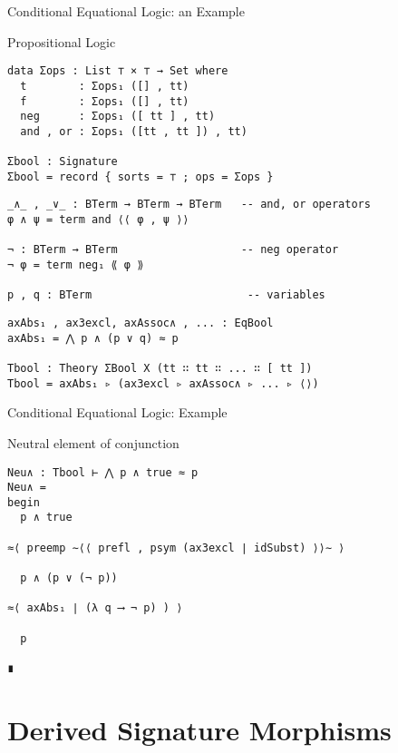 \documentclass[11pt]{beamer}
\begin{document}
\begin{frame}[fragile]{Conditional Equational Logic: an Example}

  \begin{block}{Propositional Logic}
    \begin{verbatim}
data Σops : List ⊤ × ⊤ → Set where
  t        : Σops₁ ([] , tt)
  f        : Σops₁ ([] , tt)
  neg      : Σops₁ ([ tt ] , tt)
  and , or : Σops₁ ([tt , tt ]) , tt)

Σbool : Signature
Σbool = record { sorts = ⊤ ; ops = Σops }
\end{verbatim}
%
\pause
%    
\begin{verbatim}
_∧_ , _∨_ : BTerm → BTerm → BTerm   -- and, or operators
φ ∧ ψ = term and ⟨⟨ φ , ψ ⟩⟩
  
¬ : BTerm → BTerm                   -- neg operator
¬ φ = term neg₁ ⟪ φ ⟫   

p , q : BTerm                        -- variables
\end{verbatim}
\pause
\begin{verbatim}
axAbs₁ , ax3excl, axAssoc∧ , ... : EqBool
axAbs₁ = ⋀ p ∧ (p ∨ q) ≈ p

Tbool : Theory ΣBool X (tt ∷ tt ∷ ... ∷ [ tt ])
Tbool = axAbs₁ ▹ (ax3excl ▹ axAssoc∧ ▹ ... ▹ ⟨⟩)
\end{verbatim}
    
\end{block}
\end{frame}

\begin{frame}[fragile]{Conditional Equational Logic: Example}

\begin{block}{Neutral element of conjunction}
\begin{verbatim}
Neu∧ : Tbool ⊢ ⋀ p ∧ true ≈ p
Neu∧ =
begin
  p ∧ true

≈⟨ preemp ∼⟨⟨ prefl , psym (ax3excl ∣ idSubst) ⟩⟩∼ ⟩

  p ∧ (p ∨ (¬ p))

≈⟨ axAbs₁ ∣ (λ q ⟶ ¬ p) ) ⟩

  p

∎
\end{verbatim}
\end{block}
\end{frame}



\section{Derived Signature Morphisms}
\end{document}
